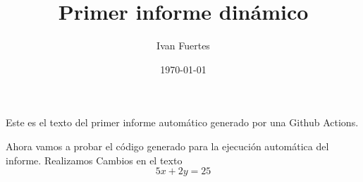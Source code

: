 \documentclass[12pt, a4paper]{book}
\title{Primer informe dinámico}
\author{Ivan Fuertes}
\date{\today}
\begin{document}
\maketitle

Este es el texto del primer informe automático generado por una Github Actions.\newline

Ahora vamos a probar el código generado para la ejecución automática del informe. Realizamos Cambios en el texto
$$
5x+2y=25
$$
\end{document}
